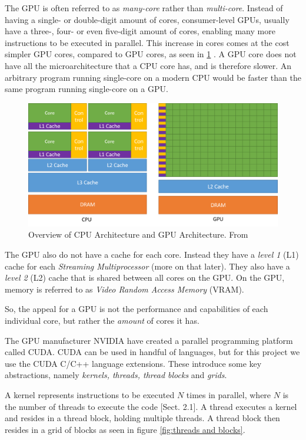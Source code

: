 The GPU is often referred to as \textit{many-core} rather than \textit{multi-core}. Instead of having a single- or double-digit amount of cores, consumer-level GPUs, usually have a three-, four- or even five-digit amount of cores, enabling many more instructions to be executed in parallel. This increase in cores comes at the cost simpler GPU cores, compared to GPU cores, as seen in \ref{fig:cpu_vs_gpu} \cite[Sect. 1.1]{nvidia:cudadoc}. A GPU core does not have all the microarchitecture that a CPU core has, and is therefore slower. An arbitrary program running single-core on a modern CPU would be faster than the same program running single-core on a GPU.

\begin{figure}[ht]
\includegraphics[width=\textwidth]{Documents/Report/Figures/CPU vs GPU .png}
\caption{Overview of CPU Architecture and GPU Architecture. From \cite{nvidia:cudadoc}}
\label{fig:cpu_vs_gpu}
\end{figure}

The GPU also do not have a cache for each core. Instead they have a \textit{level 1} (L1) cache for each \textit{Streaming Multiprocessor} (more on that later). They also have a \textit{level 2} (L2) cache that is shared between all cores on the GPU. On the GPU, memory is referred to as \textit{Video Random Access Memory} (VRAM).

So, the appeal for a GPU is not the performance and capabilities of each individual core, but rather the \textit{amount} of cores it has.

\noindent The GPU manufacturer NVIDIA have created a parallel programming platform called CUDA. CUDA can be used in handful of languages, but for this project we use the CUDA C/C++ language extensions. These introduce some key abstractions, namely \textit{kernels, threads, thread blocks} and \textit{grids}. 

A kernel represents instructions to be executed $N$ times in parallel, where $N$ is the number of threads to execute the code [Sect. 2.1]\cite{nvidia:cudadoc}. A thread executes a kernel and resides in a thread block, holding multiple threads. A thread block then resides in a grid of blocks as seen in figure \ref{fig:threads and blocks}.

